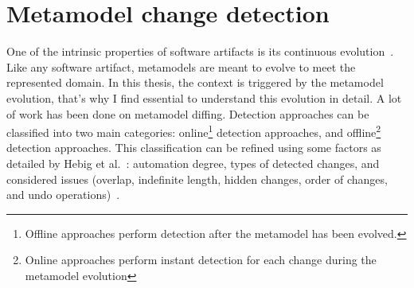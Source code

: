  \section{Metamodel change detection}
 \label{changedetection}
 One of the intrinsic properties of software artifacts is its continuous evolution~\cite{mens2008introduction}. Like any software artifact, metamodels are meant to evolve to meet the represented domain. %
 In this thesis, the context is triggered by the metamodel evolution, that's why I find essential to understand this evolution in detail.
 A lot of work has been done on metamodel diffing.
 Detection approaches can be classified into two main categories: online\footnote{Offline approaches perform detection after the metamodel has been evolved.} detection approaches, and offline\footnote{Online approaches perform instant detection for each change during the metamodel evolution} detection approaches. This classification can be refined using some factors as detailed by Hebig et al.~\cite{hebig2016approaches}: automation degree, types of detected changes, and considered issues (overlap, indefinite length, hidden changes, order of changes, and undo operations)~\cite{hebig2016approaches}.
 	
 
 
